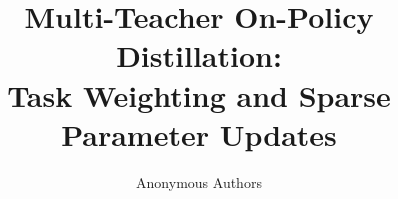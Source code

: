 \documentclass{article} %
\title{Multi-Teacher On-Policy Distillation:\\Task Weighting and Sparse Parameter Updates}
\author{Anonymous Authors}
\theoremstyle{remark}
\begin{document}
\maketitle















\appendix

\setcounter{table}{0}
\renewcommand{\thetable}{A\arabic{table}}


\end{document}
